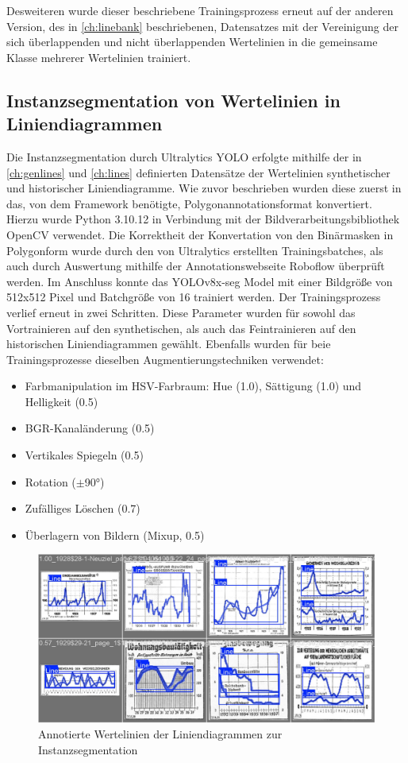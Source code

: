 Desweiteren wurde dieser beschriebene Trainingsprozess erneut auf der anderen Version, des in \ref{ch:linebank} beschriebenen, Datensatzes mit der Vereinigung der sich überlappenden und nicht überlappenden Wertelinien in die gemeinsame Klasse mehrerer Wertelinien trainiert.

\subsection{Instanzsegmentation von Wertelinien in Liniendiagrammen}

Die Instanzsegmentation durch Ultralytics YOLO erfolgte mithilfe der in \ref{ch:genlines} und \ref{ch:lines} definierten Datensätze der Wertelinien synthetischer und historischer Liniendiagramme. Wie zuvor beschrieben wurden diese zuerst in das, von dem Framework benötigte, Polygonannotationsformat konvertiert. Hierzu wurde Python 3.10.12 in Verbindung mit der Bildverarbeitungsbibliothek OpenCV \cite{opencv_library} verwendet. Die Korrektheit der Konvertation von den Binärmasken in Polygonform wurde durch den von Ultralytics erstellten Trainingsbatches, als auch durch Auswertung mithilfe der Annotationswebseite Roboflow \cite{dwyer2024roboflow} überprüft werden. Im Anschluss konnte das YOLOv8x-seg Model mit einer Bildgröße von 512x512 Pixel und Batchgröße von 16 trainiert werden. Der Trainingsprozess verlief erneut in zwei Schritten.
Diese Parameter wurden für sowohl das Vortrainieren auf den synthetischen, als auch das Feintrainieren auf den  historischen Liniendiagrammen gewählt. Ebenfalls wurden für beie Trainingsprozesse dieselben Augmentierungstechniken verwendet:

\begin{itemize}[itemsep=0pt, topsep=0pt]
    \item Farbmanipulation im HSV-Farbraum: Hue (1.0), Sättigung (1.0) und Helligkeit (0.5)
    \item BGR-Kanaländerung (0.5)
    \item Vertikales Spiegeln (0.5)
    \item Rotation ($\pm$90°)
    \item Zufälliges Löschen (0.7)
    \item Überlagern von Bildern (Mixup, 0.5)
\end{itemize}

\begin{figure}[h!]
    \centering
    \captionsetup{width=.75\linewidth}
    \includegraphics[width=.75\textwidth]{Implementation/img/instance_annotated.png}
    \caption{ Annotierte Wertelinien der Liniendiagrammen zur Instanzsegmentation}
    \label{fig:instance_annotated}
\end{figure}

